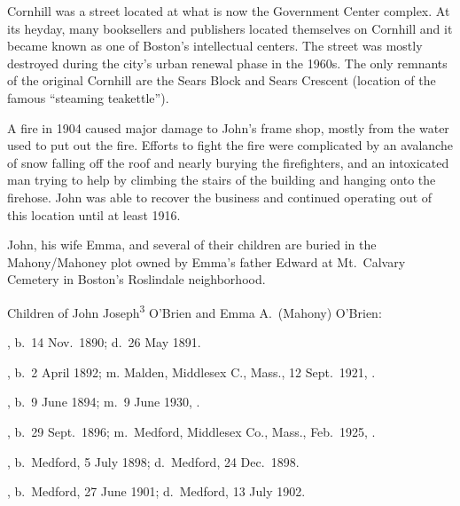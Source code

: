 Cornhill was a street located at what is now the Government Center complex. At its heyday, many booksellers and publishers located themselves on Cornhill and it became known as one of Boston's intellectual centers.\cite{Cornhill} The street was mostly destroyed during the city's urban renewal phase in the 1960s. The only remnants of the original Cornhill are the Sears Block and Sears Crescent (location of the famous ``steaming teakettle'').\cite{Cornhill} 

A fire in 1904 caused major damage to John's frame shop, mostly from the water used to put out the fire. Efforts to fight the fire were complicated by an avalanche of snow falling off the roof and nearly burying the firefighters, and an intoxicated man trying to help by climbing the stairs of the building and hanging onto the firehose.\cite{FrameShopFire} John was able to recover the business and continued operating out of this location until at least 1916.\cite{John3OBrien1916}

John, his wife Emma, and several of their children are buried in the Mahony/Mahoney plot owned by Emma's father Edward at Mt.\ Calvary Cemetery in Boston's Roslindale neighborhood.\cite{John3OBrienBurial}

\begin{KidsIntro}
	Children of John Joseph\textsuperscript{3} O'Brien and Emma A.\ (Mahony) O'Brien:
\end{KidsIntro}

\begin{Kids}
	, b.\ 14 Nov.\ 1890;\cite{Mildred4OBrienBirth} d.\ 26 May 1891.\cite{Mildred4OBrienDeath}
	
	, b.\ 2 April 1892; m. Malden, Middlesex C., Mass., 12 Sept.\ 1921, .
	
	, b.\ 9 June 1894; m.\ 9 June 1930, .
		
	, b.\ 29 Sept.\ 1896; m.\ Medford, Middlesex Co., Mass., Feb.\ 1925, .
	
	, b.\ Medford, 5 July 1898;\cite{Edward4OBrienBirth} d.\ Medford, 24 Dec.\ 1898.\cite{Edward4OBrienDeath}
	
	, b.\ Medford, 27 June 1901;\cite{Almyra4OBrienBirth} d.\ Medford, 13 July 1902.\cite{Almyra4OBrienDeath}
\end{Kids}
